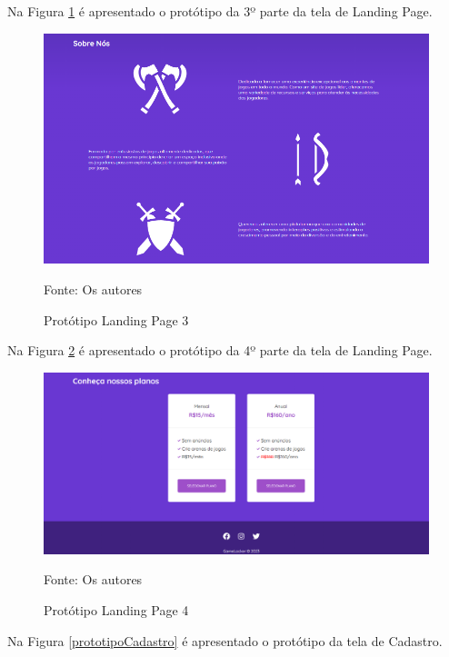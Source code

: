 \begin{apendicesenv}
Na Figura \ref{prototipoLandingPage3} é apresentado o protótipo da 3º parte da tela de Landing Page.

\begin{figure}[H]
	\centering
	\includegraphics[width=1\textwidth,keepaspectratio]{./imagens/PrototipoLandingPage3.png}
	\caption{Protótipo Landing Page 3}
	Fonte: Os autores
    \label{prototipoLandingPage3}
\end{figure}
\pagebreak

Na Figura \ref{prototipoLandingPage4} é apresentado o protótipo da 4º parte da tela de Landing Page.

\begin{figure}[H]
	\centering
	\includegraphics[width=1\textwidth,keepaspectratio]{./imagens/PrototipoLandingPage4.png}
	\caption{Protótipo Landing Page 4}
	Fonte: Os autores
    \label{prototipoLandingPage4}
\end{figure}

Na Figura \ref{prototipoCadastro} é apresentado o protótipo da tela de Cadastro.


\end{apendicesenv}
